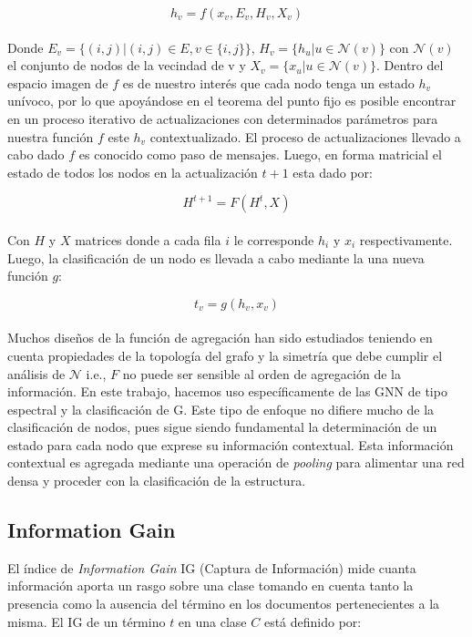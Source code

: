 	\begin{equation}
		h_v = f(x_v, E_v, H_v, X_v)
	\end{equation}
	\\
	Donde $E_v = \{(i, j)| (i, j) \in E, v \in \{i, j\}\}$,  $H_v = \{h_u| u \in \mathcal{N}(v)\}$ con $\mathcal{N}(v)$ el conjunto de nodos de la vecindad de v y $X_v = \{x_u| u \in \mathcal{N}(v)\}$. Dentro del espacio imagen de $f$ es de nuestro interés que cada nodo tenga un estado $h_v$ unívoco, por lo que apoyándose en el teorema del punto fijo \citep{brown1988fixed} es posible encontrar en un proceso iterativo de actualizaciones con determinados parámetros para nuestra función $f$ este $h_v$ contextualizado. El proceso de actualizaciones llevado a cabo dado $f$ es conocido como paso de mensajes. Luego, en forma matricial el estado de todos los nodos en la actualización $t+1$ esta dado por:
	
	\begin{equation}
		H^{t+1} = F(H^t, X)
	\end{equation} 
	\\
	Con $H$ y $X$ matrices donde a cada fila $i$ le corresponde $h_i \text{ y } x_i$ respectivamente. Luego, la clasificación de un nodo es llevada a cabo mediante la una nueva función $g$:	
	
	\begin{equation}
		t_v = g(h_v, x_v)
	\end{equation}
	\\
	Muchos diseños de la función de agregación han sido estudiados \citep{kipf2017semisupervised} teniendo en cuenta propiedades de la topología del grafo y la simetría que debe cumplir el análisis de $\mathcal{N}$ i.e., $F$ no puede ser sensible al orden de agregación de la información. En este trabajo, hacemos uso específicamente de las GNN de tipo espectral \citep{Wu_2021} y la clasificación de G. Este tipo de enfoque no difiere mucho de la clasificación de nodos, pues sigue siendo fundamental la determinación de un estado para cada nodo que exprese su información contextual. Esta información contextual es agregada mediante una operación de \textit{pooling} para alimentar una red densa y proceder con la clasificación de la estructura.
	
\subsection{Information Gain}

	El índice de \textit{Information Gain }IG (Captura de Información) \citep{10.5555/3091696.3091731,sebastiani2002machine} mide cuanta información aporta un rasgo sobre una clase tomando en cuenta tanto la presencia como la ausencia del término en los documentos pertenecientes a la misma. El IG de un término $t$ en una clase $C$ está definido por:
	
